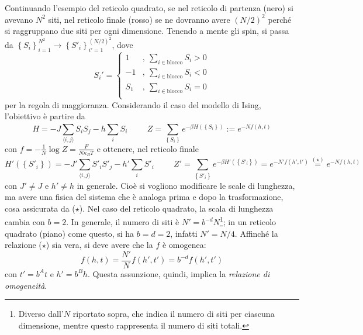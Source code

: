\documentclass[11pt, a4paper]{scrartcl}
\theoremstyle{style}
\theoremstyle{style1}
\numberwithin{equation}{subsection}
\begin{document}
Continuando l'esempio del reticolo quadrato, se nel reticolo di partenza (nero) si avevano $N^2$ siti, nel reticolo finale (rosso) se ne dovranno avere $(N / 2)^2$ perch\'e si raggruppano due siti per ogni dimensione.
Tenendo a mente gli spin, si passa da $\left\{ S_i \right\}_{i=1}  ^{N^2} \longrightarrow \left\{ S'_i \right\} _{i' =1} ^{(N/2)^2} $, dove
\[
S_i ' = \begin{cases}
	1 &,\ \displaystyle \sum_{i \in \text{blocco}}^{} S_i > 0 \\
	-1 &,\ \displaystyle \sum_{i \in \text{blocco}}^{} S_i < 0 \\
	S_1 &,\ \displaystyle \sum_{i \in \text{blocco}}^{} S_i = 0 \\
\end{cases}
\] 
per la regola di maggioranza.
Considerando il caso del modello di Ising, l'obiettivo \`e partire da 
\[
H = - J \sum_{\langle i,j \rangle}^{} S_iS_j - h \sum_{i}^{} S_i \hspace{1cm} Z = \sum_{\left\{ S_i \right\} }^{} e^{-\beta H\left(\left\{ S_i \right\} \right) } := e ^{- N f(h,t)}
\] 
con $f = -\frac{1}{N}\log Z = \frac{F}{N\kappa _BT}$ e ottenere, nel reticolo finale
\[
H'\left(\left\{ S'_i \right\} \right)  = - J' \sum_{\langle i,j \rangle}^{} S'_i S'_j - h' \sum_{i}^{} S'_i \hspace{1cm} Z ' = \sum_{\left\{ S'_i \right\} }^{} e^{-\beta H ' \left(\left\{ S'_i \right\} \right) } = e^{-N' f(h',t')} \stackrel{(\star)}{=} e^{-Nf (h,t)}
\] 
con $J'\neq J$ e $h' \neq h$ in generale.
Cio\`e si vogliono modificare le scale di lunghezza, ma avere una fisica del sistema che \`e analoga prima e dopo la trasformazione, cosa assicurata da ($\star$).
Nel caso del reticolo quadrato, la scala di lunghezza cambia con $b=2$. 
In generale, il numero di siti \`e $N' = b^{-d}N$\footnote{Diverso dall'$N$ riportato sopra, che indica il numero di siti per ciascuna dimensione, mentre questo rappresenta il numero di siti totali.}; in un reticolo quadrato (piano) come questo, si ha $b=d=2$, infatti $N ' = N / 4 $.
Affinch\'e la relazione ($\star$) sia vera, si deve avere che la $f$ \`e omogenea:
\[
f(h,t) = \frac{N'}{N} f(h',t') = b^{-d} f( h',t')
\] 
con $t' = b^{A}t$ e $h'=b^{B}h$.
Questa assunzione, quindi, implica la \textit{relazione di omogeneit\`a}.
\end{document}
